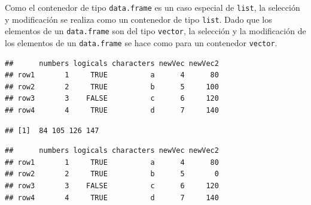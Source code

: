 \documentclass[
]{book}
\newenvironment{Shaded}{\begin{snugshade}}{\end{snugshade}}
\newcommand{\DecValTok}[1]{\textcolor[rgb]{0.00,0.00,0.81}{#1}}
\newcommand{\KeywordTok}[1]{\textcolor[rgb]{0.13,0.29,0.53}{\textbf{#1}}}
\newcommand{\NormalTok}[1]{#1}
\newcommand{\OperatorTok}[1]{\textcolor[rgb]{0.81,0.36,0.00}{\textbf{#1}}}
\newcommand{\StringTok}[1]{\textcolor[rgb]{0.31,0.60,0.02}{#1}}
\begin{document}
Como el contenedor de tipo \texttt{data.frame} es un caso especial de \texttt{list}, la selección y modificación se realiza como un contenedor de tipo \texttt{list}. Dado que los elementos de un \texttt{data.frame} son del tipo \texttt{vector}, la selección y la modificación de los elementos de un \texttt{data.frame} se hace como para un contenedor \texttt{vector}.

\begin{Shaded}
\end{Shaded}

\begin{verbatim}
##      numbers logicals characters newVec newVec2
## row1       1     TRUE          a      4      80
## row2       2     TRUE          b      5     100
## row3       3    FALSE          c      6     120
## row4       4     TRUE          d      7     140
\end{verbatim}

\begin{Shaded}
\end{Shaded}

\begin{verbatim}
## [1]  84 105 126 147
\end{verbatim}

\begin{Shaded}
\end{Shaded}

\begin{verbatim}
##      numbers logicals characters newVec newVec2
## row1       1     TRUE          a      4      80
## row2       2     TRUE          b      5       0
## row3       3    FALSE          c      6     120
## row4       4     TRUE          d      7     140
\end{verbatim}
\end{document}
